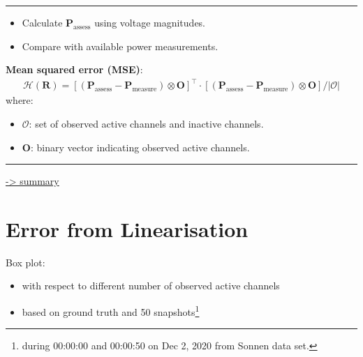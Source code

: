 \documentclass[
]{book}
\providecommand{\tightlist}{%
  \setlength{\itemsep}{0pt}\setlength{\parskip}{0pt}}
\begin{document}
\begin{center}\rule{0.5\linewidth}{0.5pt}\end{center}

\begin{itemize}
\tightlist
\item
  Calculate \(\boldsymbol{P}_\text{assess}\) using voltage magnitudes.
\item
  Compare with available power measurements.
\end{itemize}

\textbf{Mean squared error (MSE)}:
\[ \begin{aligned}
  \mathcal{H}(\boldsymbol{R}) =
  \left[
    (\boldsymbol{P}_\text{assess} - \boldsymbol{P}_\text{measure})
    \otimes \boldsymbol{O}
  \right]^\top
  \cdot \left[
    (\boldsymbol{P}_\text{assess} - \boldsymbol{P}_\text{measure})
    \otimes \boldsymbol{O}
  \right]
  / |\mathcal{O}|
\end{aligned} \]
where:

\begin{itemize}
\tightlist
\item
  \(\mathcal{O}\): set of observed active channels and inactive channels.
\item
  \(\boldsymbol{O}\): binary vector indicating observed active channels.
\end{itemize}

\begin{center}\rule{0.5\linewidth}{0.5pt}\end{center}

\protect\hyperlink{summary}{-\textgreater{} summary}

\hypertarget{error}{%
\section{Error from Linearisation}\label{error}}

Box plot:

\begin{itemize}
\tightlist
\item
  with respect to different number of observed active channels
\item
  based on ground truth and 50 snapshots\footnote{during 00:00:00 and 00:00:50 on Dec
    2, 2020 from Sonnen data set.}
\end{itemize}
\end{document}

